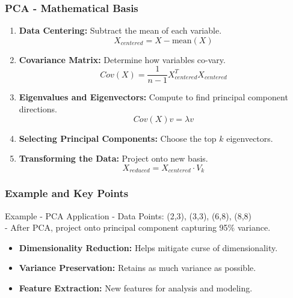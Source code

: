 \documentclass[aspectratio=169]{beamer}
\begin{document}
\begin{frame}[fragile]
    \frametitle{PCA - Mathematical Basis}
    
    \begin{enumerate}
        \item \textbf{Data Centering:} Subtract the mean of each variable.
        \begin{equation}
            X_{centered} = X - \text{mean}(X)
        \end{equation}
        
        \item \textbf{Covariance Matrix:} Determine how variables co-vary.
        \begin{equation}
            Cov(X) = \frac{1}{n-1} X_{centered}^T X_{centered}
        \end{equation}
        
        \item \textbf{Eigenvalues and Eigenvectors:} Compute to find principal component directions.
        \begin{equation}
            Cov(X) v = \lambda v 
        \end{equation}
        
        \item \textbf{Selecting Principal Components:} Choose the top \(k\) eigenvectors.
        
        \item \textbf{Transforming the Data:} Project onto new basis.
        \begin{equation}
            X_{reduced} = X_{centered} \cdot V_k 
        \end{equation}
    \end{enumerate}
\end{frame}

\begin{frame}[fragile]
    \frametitle{Example and Key Points}
    
    \begin{block}{Example - PCA Application}
        - Data Points: (2,3), (3,3), (6,8), (8,8)\\
        - After PCA, project onto principal component capturing 95\% variance.
    \end{block}
    
    \begin{itemize}
        \item \textbf{Dimensionality Reduction:} Helps mitigate curse of dimensionality.
        \item \textbf{Variance Preservation:} Retains as much variance as possible.
        \item \textbf{Feature Extraction:} New features for analysis and modeling.
    \end{itemize}
\end{frame}
\end{document}
